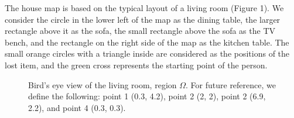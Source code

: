 \documentclass{article}
\begin{document}
\vspace{5mm}

\noindent The house map is based on the typical layout of a living room (Figure 1). We consider the circle in the lower left of the map as the dining table, the larger rectangle above it as the sofa, the small rectangle above the sofa as the TV bench, and the rectangle on the right side of the map as the kitchen table. The small orange circles with a triangle inside are considered as the positions of the lost item, and the green cross represents the starting point of the person.

\begin{figure}[!h]
\centering
{}
\captionsetup{font=small}
\caption{Bird's eye view of the living room, region $\Omega$. For future reference, we define the following: point 1 (0.3, 4.2), point 2 (2, 2), point 2 (6.9, 2.2), and point 4 (0.3, 0.3).}
\label{fig:placeholder}
\end{figure}
\end{document}
